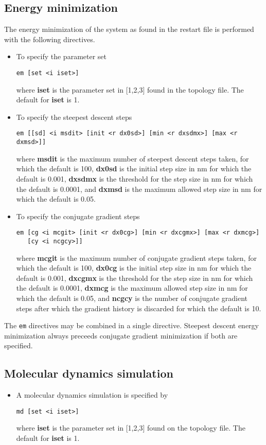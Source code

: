 \subsection{Energy minimization}
The energy minimization of the system as found in the restart file 
is performed with the following directives.
\begin{itemize}
\item
To specify the parameter set
\begin{verbatim}
em [set <i iset>] 
\end{verbatim}
where {\bf iset} is the parameter set in [1,2,3] found in the
topology file. The default for {\bf iset} is 1.
\item
To specify the steepest descent steps
\begin{verbatim}
em [[sd] <i msdit> [init <r dx0sd>] [min <r dxsdmx>] [max <r dxmsd>]] 
\end{verbatim}
where {\bf msdit} is the maximum number of steepest descent steps taken,
for which the default is 100, {\bf dx0sd} is the initial step size in nm
for which the default is 0.001, {\bf dxsdmx} is the threshold for the
step size in nm for which the default is 0.0001, and {\bf dxmsd} is the
maximum allowed step size in nm for which the default is 0.05.
\item
To specify the conjugate gradient steps
\begin{verbatim}
em [cg <i mcgit> [init <r dx0cg>] [min <r dxcgmx>] [max <r dxmcg>]
   [cy <i ncgcy>]]
\end{verbatim}
where {\bf mcgit} is the maximum number of conjugate gradient steps taken,
for which the default is 100, {\bf dx0cg} is the initial step size in nm
for which the default is 0.001, {\bf dxcgmx} is the threshold for the
step size in nm for which the default is 0.0001, {\bf dxmcg} is the
maximum allowed step size in nm for which the default is 0.05, and {\bf ncgcy}
is the number of conjugate gradient steps after which the gradient history
is discarded for which the default is 10.
\end{itemize}
The \verb+em+ directives may be combined in a single directive. Steepest
descent energy minimization always preceeds conjugate gradient minimization
if both are specified.
\subsection{Molecular dynamics simulation}
\begin{itemize}
\item
A molecular dynamics simulation is specified by
\begin{verbatim}
md [set <i iset>]
\end{verbatim}
where {\bf iset} is the parameter set in [1,2,3] found on the
topology file. The default for {\bf iset} is 1.
\end{itemize}
